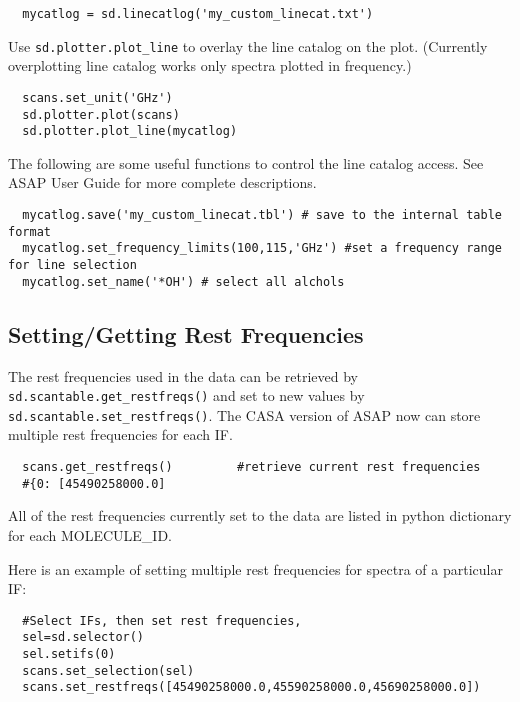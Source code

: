 \small
\begin{verbatim}
  mycatlog = sd.linecatlog('my_custom_linecat.txt')
\end{verbatim}
\normalsize

Use {\tt sd.plotter.plot\_line} to overlay the line catalog on 
the plot. (Currently overplotting line catalog works only spectra plotted
in frequency.)

\small
\begin{verbatim}
  scans.set_unit('GHz')
  sd.plotter.plot(scans)
  sd.plotter.plot_line(mycatlog)
\end{verbatim}
\normalsize

The following are some useful functions to control the line catalog
access. See ASAP User Guide for more complete descriptions.

\small
\begin{verbatim}
  mycatlog.save('my_custom_linecat.tbl') # save to the internal table format
  mycatlog.set_frequency_limits(100,115,'GHz') #set a frequency range for line selection
  mycatlog.set_name('*OH') # select all alchols
\end{verbatim}
\normalsize


\subsection{Setting/Getting Rest Frequencies}
\label{subsection:sd.asap.restfreqs}

The rest frequencies used in the data can be retrieved by 
{\tt sd.scantable.get\_restfreqs()} and set to new values by 
{\tt sd.scantable.set\_restfreqs()}.
The CASA version of ASAP now can store multiple rest frequencies 
for each IF.

\small
\begin{verbatim}
  scans.get_restfreqs()         #retrieve current rest frequencies
  #{0: [45490258000.0]
\end{verbatim}
\normalsize

All of the rest frequencies currently set to the data are listed in
python dictionary for each MOLECULE\_ID.

Here is an example of setting multiple rest frequencies for spectra of a particular IF:

\small
\begin{verbatim}
  #Select IFs, then set rest frequencies,
  sel=sd.selector()
  sel.setifs(0)
  scans.set_selection(sel)
  scans.set_restfreqs([45490258000.0,45590258000.0,45690258000.0])
\end{verbatim}
\normalsize

